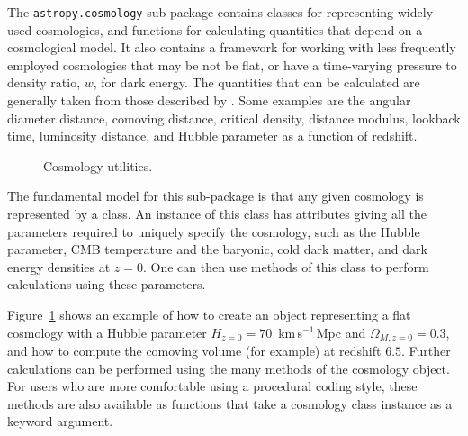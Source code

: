 \documentclass[traditabstract]{aa}
\begin{document}
\label{sec:cosmology}


The \texttt{astropy.cosmology} sub-package contains classes for
representing widely used cosmologies, and functions for calculating
quantities that depend on a cosmological model. It also contains a
framework for working with less frequently employed cosmologies that
may be not be flat, or have a time-varying pressure to density ratio,
$w$, for dark energy. The quantities that can be calculated are
generally taken from those described by \citet{Hogg99}. Some examples
are the angular diameter distance, comoving distance, critical
density, distance modulus, lookback time, luminosity distance, and
Hubble parameter as a function of redshift.

\begin{figure}
\caption{Cosmology utilities.\label{code:cosmology}}
\end{figure}

The fundamental model for this sub-package is that any given cosmology
is represented by a class. An instance of this class has attributes
giving all the parameters required to uniquely specify the cosmology,
such as the Hubble parameter, CMB temperature and the baryonic, cold
dark matter, and dark energy densities at $z=0$. One can then use
methods of this class to perform calculations using these parameters.

Figure~\ref{code:cosmology} shows an example of how to create an object
representing a flat cosmology with a Hubble parameter $H_{z=0} =
70$~km\,s$^{-1}$\,Mpc and $\Omega_{M,z=0} = 0.3$, and how to compute the
comoving volume (for example) at redshift $6.5$. Further calculations can be
performed using the many methods of the cosmology object. For users who are
more comfortable using a procedural coding style, these methods are also
available as functions that take a cosmology class instance as a keyword
argument.
\end{document}
